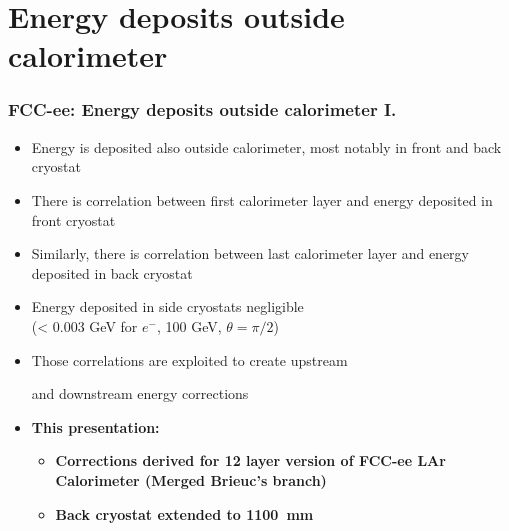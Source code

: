 \documentclass[aspectratio=169]{beamer}
\newcommand{\bluetext}[1]{%
  \textcolor{myBlue}{#1}
}
\newcommand{\redtext}[1]{%
  \textcolor{myRed}{#1}
}
\begin{document}
\section{Energy deposits outside calorimeter}

\begin{frame}
  \frametitle{FCC-ee: Energy deposits outside calorimeter I.}

  \begin{itemize}
    \item Energy is deposited also outside calorimeter, most notably in front
          and back cryostat
    \item There is correlation between first calorimeter layer and energy
          deposited in front cryostat
    \item Similarly, there is correlation between last calorimeter layer and
          energy deposited in back cryostat
    \item Energy deposited in side cryostats negligible \\
          (< 0.003 GeV for $e^{-}$, 100 GeV, $\theta = \pi/2$)
    \item Those correlations are exploited to create \redtext{upstream}
          and \redtext{downstream} energy corrections
    \item \bluetext{\bf This presentation:}
          \begin{itemize}
            \item \bluetext{\bf Corrections derived for 12 layer version of FCC-ee LAr
              Calorimeter (Merged Brieuc's branch)}
            \item \bluetext{\bf Back cryostat extended to 1100~mm}
          \end{itemize}
  \end{itemize}
\end{frame}
\end{document}
